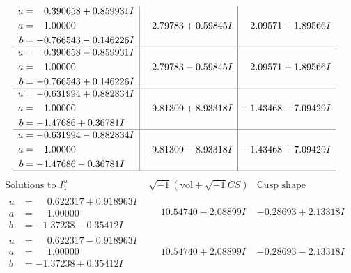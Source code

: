 \documentclass[1p]{elsarticle_modified}
\theoremstyle{definition}
\newcommand{\I}{\sqrt{-1}}
\begin{document}
$$\begin{array}{c|c|c}
\begin{aligned}
u &= \phantom{-}0.390658 + 0.859931 I \\
a &= \phantom{-}1.00000\phantom{ +0.000000I} \\
b &= -0.766543 - 0.146226 I\end{aligned}
 & \phantom{-}2.79783 + 0.59845 I & \phantom{-}2.09571 - 1.89566 I \\ \hline\begin{aligned}
u &= \phantom{-}0.390658 - 0.859931 I \\
a &= \phantom{-}1.00000\phantom{ +0.000000I} \\
b &= -0.766543 + 0.146226 I\end{aligned}
 & \phantom{-}2.79783 - 0.59845 I & \phantom{-}2.09571 + 1.89566 I \\ \hline\begin{aligned}
u &= -0.631994 + 0.882834 I \\
a &= \phantom{-}1.00000\phantom{ +0.000000I} \\
b &= -1.47686 + 0.36781 I\end{aligned}
 & \phantom{-}9.81309 + 8.93318 I & -1.43468 - 7.09429 I \\ \hline\begin{aligned}
u &= -0.631994 - 0.882834 I \\
a &= \phantom{-}1.00000\phantom{ +0.000000I} \\
b &= -1.47686 - 0.36781 I\end{aligned}
 & \phantom{-}9.81309 - 8.93318 I & -1.43468 + 7.09429 I\\
 \hline 
 \end{array}$$\newpage$$\begin{array}{c|c|c}  
\text{Solutions to }I^u_{1}& \I (\text{vol} + \sqrt{-1}CS) & \text{Cusp shape}\\
 \hline 
\begin{aligned}
u &= \phantom{-}0.622317 + 0.918963 I \\
a &= \phantom{-}1.00000\phantom{ +0.000000I} \\
b &= -1.37238 - 0.35412 I\end{aligned}
 & \phantom{-}10.54740 - 2.08899 I & -0.28693 + 2.13318 I \\ \hline\begin{aligned}
u &= \phantom{-}0.622317 - 0.918963 I \\
a &= \phantom{-}1.00000\phantom{ +0.000000I} \\
b &= -1.37238 + 0.35412 I\end{aligned}
 & \phantom{-}10.54740 + 2.08899 I & -0.28693 - 2.13318 I \\ \hline\begin{aligned}

\end{aligned}
\end{array}$$
\end{document}
